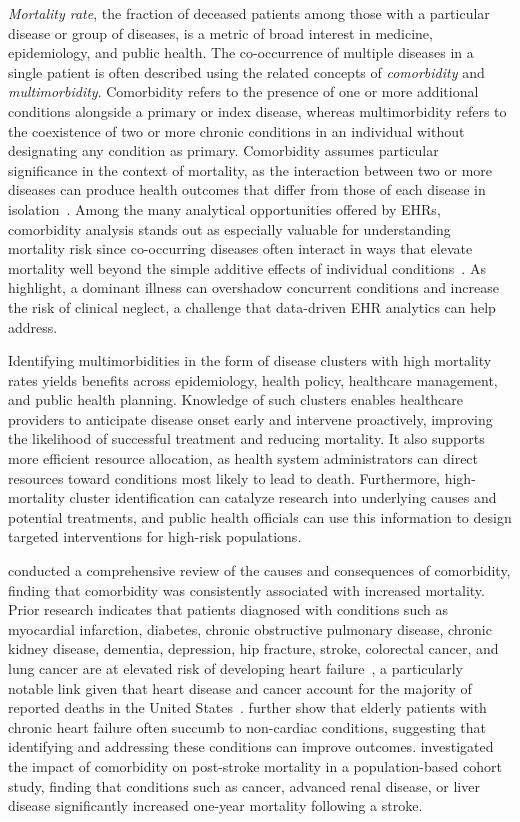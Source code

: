 \textit{Mortality rate}, the fraction of deceased patients among those
with a particular disease or group of diseases, is a metric of broad
interest in medicine, epidemiology, and public health. The co-occurrence of multiple diseases in a single patient is often described using the related concepts of \textit{comorbidity} and \textit{multimorbidity}. Comorbidity refers to the presence of one or more additional conditions alongside a primary or index disease, whereas multimorbidity refers to the coexistence of two or more chronic conditions in an individual without designating any condition as primary. Comorbidity assumes particular significance in the context of mortality, as the interaction between two or more diseases can produce health outcomes that differ from those of each
disease in isolation~\citep{FEINSTEIN1970455}. Among the many
analytical opportunities offered by EHRs, comorbidity analysis stands
out as especially valuable for understanding mortality risk since
co-occurring diseases often interact in ways that elevate mortality
well beyond the simple additive effects of individual
conditions~\citep{FEINSTEIN1970455}. As \cite{Redelmeier1998}
highlight, a dominant illness can overshadow concurrent conditions and
increase the risk of clinical neglect, a challenge that data-driven
EHR analytics can help address.

Identifying multimorbidities in the form of disease clusters with high
mortality rates yields benefits across epidemiology, health policy,
healthcare management, and public health planning. Knowledge of such
clusters enables healthcare providers to anticipate disease onset early
and intervene proactively, improving the likelihood of successful
treatment and reducing mortality. It also supports more efficient
resource allocation, as health system administrators can direct
resources toward conditions most likely to lead to death. Furthermore,
high-mortality cluster identification can catalyze research into
underlying causes and potential treatments, and public health officials
can use this information to design targeted interventions for
high-risk populations.

\cite{Gijsen2001} conducted a comprehensive review of the causes and
consequences of comorbidity, finding that comorbidity was consistently
associated with increased mortality. Prior research indicates that
patients diagnosed with conditions such as myocardial infarction,
diabetes, chronic obstructive pulmonary disease, chronic kidney
disease, dementia, depression, hip fracture, stroke, colorectal
cancer, and lung cancer are at elevated risk of developing heart
failure~\citep{Ahluwalia2012}, a particularly notable link given that
heart disease and cancer account for the majority of reported deaths
in the United States~\citep{Xu2016}. \cite{Braunstein2003} further
show that elderly patients with chronic heart failure often succumb to
non-cardiac conditions, suggesting that identifying and addressing
these conditions can improve outcomes. \cite{CORRAINI2018242}
investigated the impact of comorbidity on post-stroke mortality in a
population-based cohort study, finding that conditions such as cancer,
advanced renal disease, or liver disease significantly increased
one-year mortality following a stroke.

